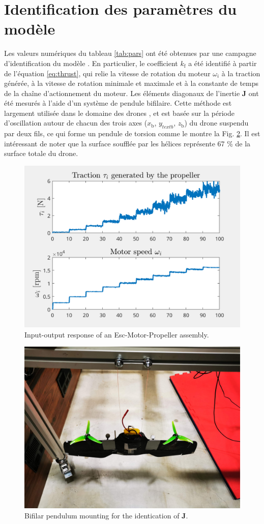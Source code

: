 \section{Identification des paramètres du modèle}
    Les valeurs numériques du tableau \ref{tab:pars} ont été obtenues par une campagne d'identification du modèle \cite{sansouStage}. En particulier, le coefficient $k_{\text{f}}$ a été identifié à partir de l'équation \eqref{eq:thrust}, qui relie la vitesse de rotation du moteur $\omega_{i}$ à la traction générée, à la vitesse de rotation minimale et maximale et à la constante de temps de la chaîne d'actionnement du moteur. Les éléments diagonaux de l'inertie $\boldsymbol{J}$ ont été mesurés à l'aide d'un système de pendule bifilaire. Cette méthode est largement utilisée dans le domaine des drones \cite{Jardin2007OptimizedMO}, et est basée sur la période d'oscillation autour de chacun des trois axes ($x_{{\text{b}}}$, $y_{text{b}}$, $z_{\text{b}}$) du drone suspendu par deux fils, ce qui forme un pendule de torsion comme le montre la Fig. \ref{fig:BifilarPend}.
    Il est intéressant de noter que la surface soufflée par les hélices représente 67 \% de la surface totale du drone.


    \begin{figure}[ht!]
        \centerline{
        \includegraphics[trim=0cm 0cm 0cm 0cm,clip,width=0.5\columnwidth]{figures/ident_motor March 27 2024 1651.png}}
        \caption{Input-output response of an Esc-Motor-Propeller assembly.}
        \label{IOmot}
    \end{figure}

    \begin{figure}[ht!]
        \centerline{
        \includegraphics[trim=20cm 15cm 23cm 0cm,clip,width=0.6\columnwidth]{figures/IMG_20230609_085023.jpg}}
        \caption{Bifilar pendulum mounting for the identication of $\boldsymbol{J}$.}
        \label{fig:BifilarPend}
    \end{figure}


